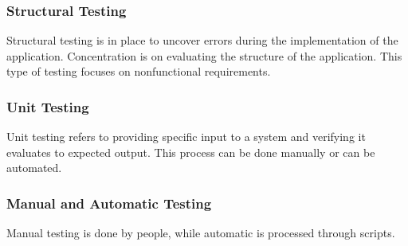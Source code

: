 \documentclass[12pt]{article}
\begin{document}
\subsubsection{Structural Testing}
Structural testing is in place to uncover errors during the implementation of the application. Concentration is on evaluating the structure of the application. This type of testing focuses on nonfunctional requirements.   

\subsubsection{Unit Testing}
Unit testing refers to providing specific input to a system and verifying it evaluates to expected output. This process can be done manually or can be automated.

\subsubsection{Manual and Automatic Testing}
Manual testing is done by people, while automatic is processed through scripts. 
\end{document}
